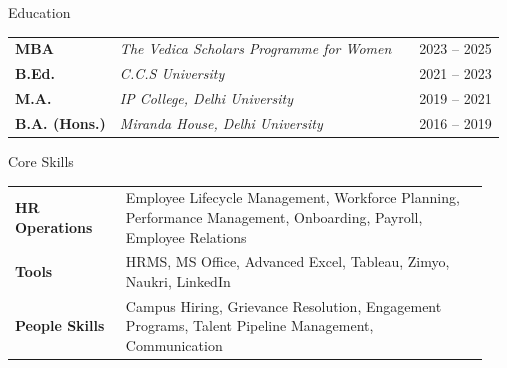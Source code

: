 \documentclass[hidelinks]{resume}
\begin{document}
\begin{rSection}{Education}
    \bgroup
    \def\arraystretch{1.2}
    \begin{tabularx}{\textwidth}{l l X l}
        \textcolor{primary}{\textbf{MBA}}          & \textit{The Vedica Scholars Programme for Women} &  & \textcolor{muted}{2023 -- 2025} \\
        \textcolor{primary}{\textbf{B.Ed.}}        & \textit{C.C.S University}                        &  & \textcolor{muted}{2021 -- 2023} \\
        \textcolor{primary}{\textbf{M.A.}}         & \textit{IP College, Delhi University}            &  & \textcolor{muted}{2019 -- 2021} \\
        \textcolor{primary}{\textbf{B.A. (Hons.)}} & \textit{Miranda House, Delhi University}         &  & \textcolor{muted}{2016 -- 2019} \\
    \end{tabularx}
    \egroup
\end{rSection}

\begin{rSection}{Core Skills}
    \bgroup
    \def\arraystretch{1.2}
    \begin{tabular}{p{0.22\linewidth}p{0.72\linewidth}}
        \textcolor{primary}{\textbf{HR Operations}} & Employee Lifecycle Management, Workforce Planning, Performance Management, Onboarding, Payroll, Employee Relations \\
        \textcolor{primary}{\textbf{Tools}}         & HRMS, MS Office, Advanced Excel, Tableau, Zimyo, Naukri, LinkedIn                                                  \\
        \textcolor{primary}{\textbf{People Skills}} & Campus Hiring, Grievance Resolution, Engagement Programs, Talent Pipeline Management, Communication                \\
    \end{tabular}
    \egroup
\end{rSection}
\end{document}
